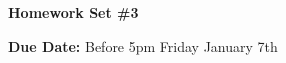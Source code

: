 


\thispagestyle{fancy}






\begin{center}
{\huge \textbf{Homework Set \#3}}
\large

{\textbf{ Due Date:} Before 5pm Friday January 7th  }
\end{center}

